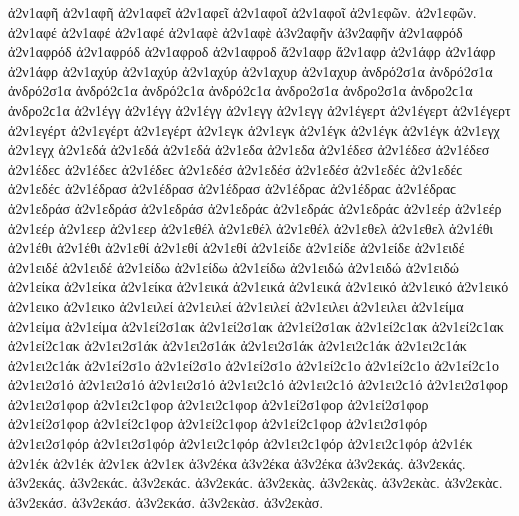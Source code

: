 {ἀ2ν1αφῆ ἀ2ν1αφῆ 
ἀ2ν1αφεῖ ἀ2ν1αφεῖ 
ἀ2ν1αφοῖ ἀ2ν1αφοῖ 
ἀ2ν1εφῶν. ἀ2ν1εφῶν. 
ἀ2ν1αφέ ἀ2ν1αφέ ἀ2ν1αφέ 
ἀ2ν1αφὲ ἀ2ν1αφὲ 
ἀ3ν2αφῆν ἀ3ν2αφῆν   %
ἀ2ν1αφρόδ ἀ2ν1αφρόδ ἀ2ν1αφρόδ   %
ἀ2ν1αφροδ ἀ2ν1αφροδ 
ἄ2ν1αφρ ἄ2ν1αφρ   %
ἀ2ν1άφρ ἀ2ν1άφρ ἀ2ν1άφρ 
ἀ2ν1αχύρ ἀ2ν1αχύρ ἀ2ν1αχύρ   %
ἀ2ν1αχυρ ἀ2ν1αχυρ 
ἀνδρό2σ1α ἀνδρό2σ1α ἀνδρό2σ1α ἀνδρό2ϲ1α ἀνδρό2ϲ1α ἀνδρό2ϲ1α   %
ἀνδρο2σ1α ἀνδρο2σ1α ἀνδρο2ϲ1α ἀνδρο2ϲ1α 
ἀ2ν1έγγ ἀ2ν1έγγ ἀ2ν1έγγ   %
ἀ2ν1εγγ ἀ2ν1εγγ 
ἀ2ν1έγερτ ἀ2ν1έγερτ ἀ2ν1έγερτ   %
ἀ2ν1εγέρτ ἀ2ν1εγέρτ ἀ2ν1εγέρτ 
ἀ2ν1εγκ ἀ2ν1εγκ   %
ἀ2ν1έγκ ἀ2ν1έγκ ἀ2ν1έγκ   %
ἀ2ν1εγχ ἀ2ν1εγχ   %
ἀ2ν1εδά ἀ2ν1εδά ἀ2ν1εδά   %
ἀ2ν1εδα ἀ2ν1εδα 
ἀ2ν1έδεσ ἀ2ν1έδεσ ἀ2ν1έδεσ ἀ2ν1έδεϲ ἀ2ν1έδεϲ ἀ2ν1έδεϲ   %
ἀ2ν1εδέσ ἀ2ν1εδέσ ἀ2ν1εδέσ ἀ2ν1εδέϲ ἀ2ν1εδέϲ ἀ2ν1εδέϲ 
ἀ2ν1έδρασ ἀ2ν1έδρασ ἀ2ν1έδρασ ἀ2ν1έδραϲ ἀ2ν1έδραϲ ἀ2ν1έδραϲ   %
ἀ2ν1εδράσ ἀ2ν1εδράσ ἀ2ν1εδράσ ἀ2ν1εδράϲ ἀ2ν1εδράϲ ἀ2ν1εδράϲ 
ἀ2ν1εέρ ἀ2ν1εέρ ἀ2ν1εέρ   %
ἀ2ν1εερ ἀ2ν1εερ 
ἀ2ν1εθέλ ἀ2ν1εθέλ ἀ2ν1εθέλ   %
ἀ2ν1εθελ ἀ2ν1εθελ 
ἀ2ν1έθι ἀ2ν1έθι ἀ2ν1έθι   %
ἀ2ν1εθί ἀ2ν1εθί ἀ2ν1εθί 
ἀ2ν1είδε ἀ2ν1είδε ἀ2ν1είδε   %
ἀ2ν1ειδέ ἀ2ν1ειδέ ἀ2ν1ειδέ 
ἀ2ν1είδω ἀ2ν1είδω ἀ2ν1είδω   %
ἀ2ν1ειδώ ἀ2ν1ειδώ ἀ2ν1ειδώ 
ἀ2ν1είκα ἀ2ν1είκα ἀ2ν1είκα   %
ἀ2ν1εικά ἀ2ν1εικά ἀ2ν1εικά 
ἀ2ν1εικό ἀ2ν1εικό ἀ2ν1εικό   %
ἀ2ν1εικο ἀ2ν1εικο 
ἀ2ν1ειλεί ἀ2ν1ειλεί ἀ2ν1ειλεί   %
ἀ2ν1ειλει ἀ2ν1ειλει 
ἀ2ν1είμα ἀ2ν1είμα ἀ2ν1είμα   %
ἀ2ν1εί2σ1ακ ἀ2ν1εί2σ1ακ ἀ2ν1εί2σ1ακ ἀ2ν1εί2ϲ1ακ ἀ2ν1εί2ϲ1ακ ἀ2ν1εί2ϲ1ακ   %
ἀ2ν1ει2σ1άκ ἀ2ν1ει2σ1άκ ἀ2ν1ει2σ1άκ ἀ2ν1ει2ϲ1άκ ἀ2ν1ει2ϲ1άκ ἀ2ν1ει2ϲ1άκ 
ἀ2ν1εί2σ1ο ἀ2ν1εί2σ1ο ἀ2ν1εί2σ1ο ἀ2ν1εί2ϲ1ο ἀ2ν1εί2ϲ1ο ἀ2ν1εί2ϲ1ο   %
ἀ2ν1ει2σ1ό ἀ2ν1ει2σ1ό ἀ2ν1ει2σ1ό ἀ2ν1ει2ϲ1ό ἀ2ν1ει2ϲ1ό ἀ2ν1ει2ϲ1ό 
ἀ2ν1ει2σ1φορ ἀ2ν1ει2σ1φορ ἀ2ν1ει2ϲ1φορ ἀ2ν1ει2ϲ1φορ   %
ἀ2ν1εί2σ1φορ ἀ2ν1εί2σ1φορ ἀ2ν1εί2σ1φορ ἀ2ν1εί2ϲ1φορ ἀ2ν1εί2ϲ1φορ ἀ2ν1εί2ϲ1φορ   %
ἀ2ν1ει2σ1φόρ ἀ2ν1ει2σ1φόρ ἀ2ν1ει2σ1φόρ ἀ2ν1ει2ϲ1φόρ ἀ2ν1ει2ϲ1φόρ ἀ2ν1ει2ϲ1φόρ 
ἀ2ν1έκ ἀ2ν1έκ ἀ2ν1έκ   %
ἀ2ν1εκ ἀ2ν1εκ 
ἀ3ν2έκα ἀ3ν2έκα ἀ3ν2έκα   %
ἀ3ν2εκάς. ἀ3ν2εκάς. ἀ3ν2εκάς. ἀ3ν2εκάϲ. ἀ3ν2εκάϲ. ἀ3ν2εκάϲ.   %
ἀ3ν2εκὰς. ἀ3ν2εκὰς. ἀ3ν2εκὰϲ. ἀ3ν2εκὰϲ. 
ἀ3ν2εκάσ. ἀ3ν2εκάσ. ἀ3ν2εκάσ. 
ἀ3ν2εκὰσ. ἀ3ν2εκὰσ. 
}
